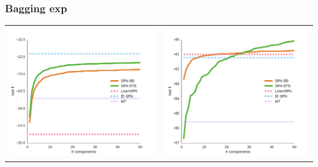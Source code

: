 \documentclass[xcolor={usenames,dvipsnames,svgnames}, compress]{beamer}
\begin{document}
\begin{frame}
  \frametitle{Bagging exp}
  \begin{table}[ht]
    \centering
    \begin{tabular}[t]{c c}
      \includegraphics[width=0.4\linewidth]{figures/curves/pumsb-star-png.pdf}&\includegraphics[width=0.4\linewidth]{figures/curves/dna-png.pdf}\\
    \end{tabular}
  \end{table}
\end{frame}
\end{document}
